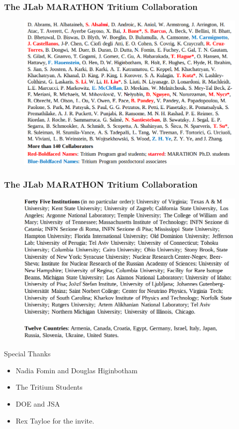 \documentclass[12pt]{beamer}
\begin{document}
\begin{frame}
\frametitle{The JLab MARATHON Tritium Collaboration}
\vspace{-15pt}

\begin{figure}
	\includegraphics[width =11.5cm]{../images/collabos_ppl.png}
\end{figure}

\end{frame}

\begin{frame}
\frametitle{The JLab MARATHON Tritium Collaboration}
\vspace{-15pt}

\begin{figure}
\includegraphics[width =11.5cm]{../images/callabos_un.png}
\end{figure}

\end{frame}

\begin{frame}{}
\begin{block}{Special Thanks}
	\begin{itemize}
		\item Nadia Fomin and Douglas Higinbotham
		\item The Tritium Students 
		\item DOE and JSA 
		\item Rex Tayloe for the invite.
	\end{itemize}
\end{block}
\end{frame}
\end{document}
